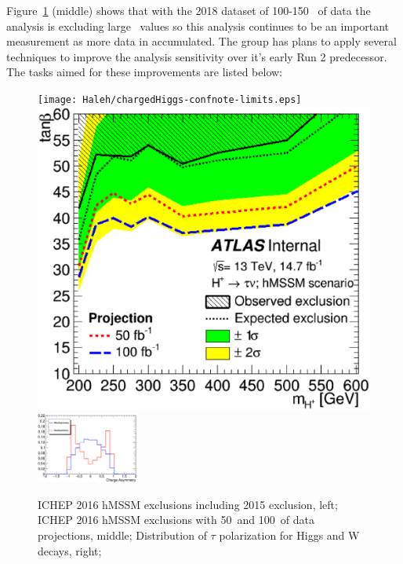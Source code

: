 Figure~\ref{fig:tau} (middle) shows that with the 2018 dataset of 100-150 \invfb\ of data the analysis is excluding large \tanb\ values so this analysis continues to be an important measurement as more data in accumulated.
The group has plans to apply several techniques to improve the analysis sensitivity over it's early Run 2 predecessor.  The tasks aimed for these improvements are listed below:




\begin{figure}\label{fig:plot1}
\begin{center}
\texttt{[image: Haleh/chargedHiggs-confnote-limits.eps]}
\includegraphics[height=0.27\textwidth]{Haleh/WithProjection_exclusion_run2016taunu_v2_hmssm_taunu.eps}
\includegraphics[height=0.25\textwidth, width=0.30\textwidth]{Haleh/tauAsy.eps}
\caption{ ICHEP 2016 hMSSM exclusions including 2015 exclusion, left; ICHEP 2016 hMSSM exclusions with 50\invfb\ and 100\invfb\ of data projections, middle; Distribution of $\tau$ polarization for Higgs and W decays, right;}
\label{fig:tau}
\end{center}
\end{figure}

